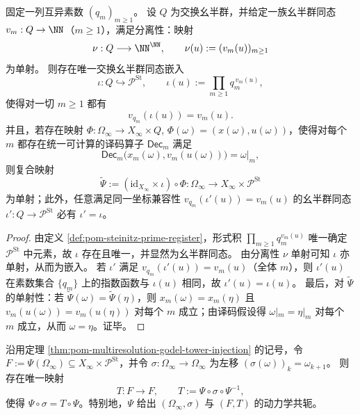 \begin{proposition}\label{prop:pom-steinitz-terminal-external-coordinates}
固定一列互异素数 \((q_m)_{m\ge 1}\)。
设 \(Q\) 为交换幺半群，并给定一族幺半群同态 \(v_m:Q\to\NN\)（\(m\ge 1\)），满足分离性：映射
\[
\nu:Q\longrightarrow \NN^{\NN},\qquad \nu(u):=(v_m(u))_{m\ge 1}
\]
为单射。
则存在唯一交换幺半群同态嵌入
\[
\iota:Q\hookrightarrow \mathcal{P}^{\mathrm{St}},\qquad
\iota(u):=\prod_{m\ge 1} q_m^{\,v_m(u)},
\]
使得对一切 \(m\ge 1\) 都有
\[
v_{q_m}(\iota(u))=v_m(u).
\]
并且，若存在映射
\(
\Phi:\Omega_\infty\to X_\infty\times Q
\),
\(\Phi(\omega)=(x(\omega),u(\omega))\)，使得对每个 \(m\) 都存在统一可计算的译码算子 \(\mathsf{Dec}_m\) 满足
\[
\mathsf{Dec}_m\bigl(x_m(\omega),v_m(u(\omega))\bigr)=\omega|_m,
\]
则复合映射
\[
\widetilde\Psi:=(\mathrm{id}_{X_\infty}\times \iota)\circ\Phi:\Omega_\infty\longrightarrow X_\infty\times \mathcal{P}^{\mathrm{St}}
\]
为单射；此外，任意满足同一坐标兼容性 \(v_{q_m}(\iota'(u))=v_m(u)\) 的幺半群同态 \(\iota':Q\to\mathcal{P}^{\mathrm{St}}\) 必有 \(\iota'=\iota\)。
\end{proposition}

\begin{proof}
由定义 \ref{def:pom-steinitz-prime-register}，形式积 \(\prod_{m\ge 1}q_m^{v_m(u)}\) 唯一确定 \(\mathcal{P}^{\mathrm{St}}\) 中元素，故 \(\iota\) 存在且唯一，并显然为幺半群同态。
由分离性 \(\nu\) 单射可知 \(\iota\) 亦单射，从而为嵌入。
若 \(\iota'\) 满足 \(v_{q_m}(\iota'(u))=v_m(u)\)（全体 \(m\)），则 \(\iota'(u)\) 在素数集合 \(\{q_m\}\) 上的指数函数与 \(\iota(u)\) 相同，故 \(\iota'(u)=\iota(u)\)。
最后，对 \(\widetilde\Psi\) 的单射性：若 \(\widetilde\Psi(\omega)=\widetilde\Psi(\eta)\)，则 \(x_m(\omega)=x_m(\eta)\) 且 \(v_m(u(\omega))=v_m(u(\eta))\) 对每个 \(m\) 成立；由译码假设得 \(\omega|_m=\eta|_m\) 对每个 \(m\) 成立，从而 \(\omega=\eta\)。证毕。
\end{proof}

\begin{corollary}\label{cor:pom-shift-conjugacy-on-godel-image}
沿用定理 \ref{thm:pom-multiresolution-godel-tower-injection} 的记号，令 \(F:=\Psi(\Omega_\infty)\subseteq X_\infty\times\mathcal{P}^{\mathrm{St}}\)，并令 \(\sigma:\Omega_\infty\to\Omega_\infty\) 为左移 \((\sigma(\omega))_k=\omega_{k+1}\)。
则存在唯一映射
\[
T:F\to F,\qquad T:=\Psi\circ\sigma\circ \Psi^{-1},
\]
使得 \(\Psi\circ\sigma=T\circ\Psi\)。特别地，\(\Psi\) 给出 \((\Omega_\infty,\sigma)\) 与 \((F,T)\) 的动力学共轭。
\end{corollary}

